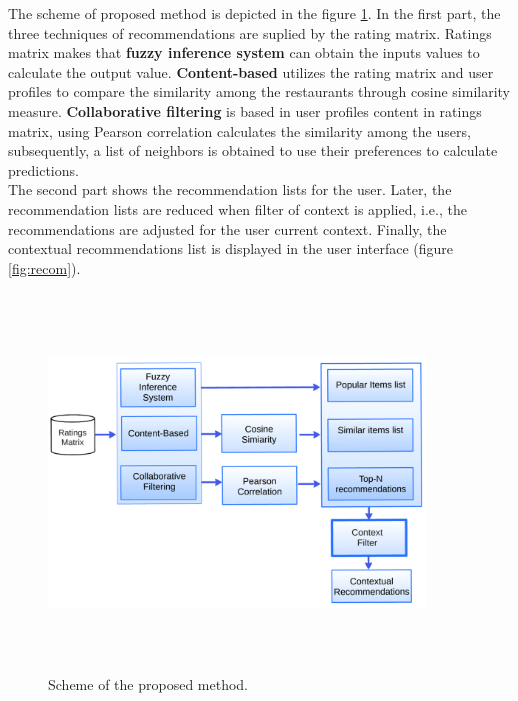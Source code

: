The scheme of proposed method is depicted in the figure
\ref{fig:archit}. In the first part, the three techniques of
recommendations are suplied by the rating matrix. 
Ratings matrix makes that \textbf{fuzzy inference system} can obtain
the inputs values to calculate the output value. \textbf{Content-based} 
utilizes the rating matrix and user profiles to compare the
similarity among the restaurants through cosine similarity measure.
\textbf{Collaborative filtering} is based in user profiles content in
ratings matrix, using Pearson correlation calculates the similarity
among the users, subsequently, a list of neighbors is obtained to use
their preferences to calculate predictions.\\
The second part shows the recommendation lists for the user. Later,
the recommendation lists are reduced when filter of context is applied,
i.e., the recommendations are adjusted for the user current context.
Finally, the contextual recommendations list is displayed in the user
interface (figure \ref{fig:recom}).
\begin{figure}
\captionsetup{font=footnotesize}
\centering 
\includegraphics[width=10cm,height=10cm,keepaspectratio]{img/archit.png}
\caption{Scheme of the proposed method.}
\label{fig:archit}  
\end{figure}





